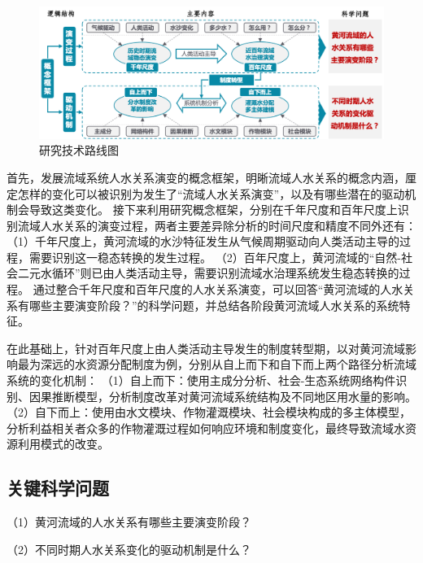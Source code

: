 \begin{figure}[htb] %
    \includegraphics[width=\textwidth]{img/ch1/ch1_workflow.png}
    \caption{研究技术路线图}\label{ch1:fig:workflow}
\end{figure}

首先，发展流域系统人水关系演变的概念框架，明晰流域人水关系的概念内涵，厘定怎样的变化可以被识别为发生了“流域人水关系演变”，以及有哪些潜在的驱动机制会导致这类变化。
接下来利用研究概念框架，分别在千年尺度和百年尺度上识别流域人水关系的演变过程，两者主要差异除分析的时间尺度和精度不同外还有：
（1）千年尺度上，黄河流域的水沙特征发生从气候周期驱动向人类活动主导的过程，需要识别这一稳态转换的发生过程。
（2）百年尺度上，黄河流域的“自然-社会二元水循环”则已由人类活动主导，需要识别流域水治理系统发生稳态转换的过程。
通过整合千年尺度和百年尺度的人水关系演变，可以回答“黄河流域的人水关系有哪些主要演变阶段？”的科学问题，并总结各阶段黄河流域人水关系的系统特征。

在此基础上，针对百年尺度上由人类活动主导发生的制度转型期，以对黄河流域影响最为深远的水资源分配制度为例，分别从自上而下和自下而上两个路径分析流域系统的变化机制：
（1）自上而下：使用主成分分析、社会-生态系统网络构件识别、因果推断模型，分析制度改革对黄河流域系统结构及不同地区用水量的影响。
（2）自下而上：使用由水文模块、作物灌溉模块、社会模块构成的多主体模型，分析利益相关者众多的作物灌溉过程如何响应环境和制度变化，最终导致流域水资源利用模式的改变。

\subsection{关键科学问题}

（1）黄河流域的人水关系有哪些主要演变阶段？

（2）不同时期人水关系变化的驱动机制是什么？
